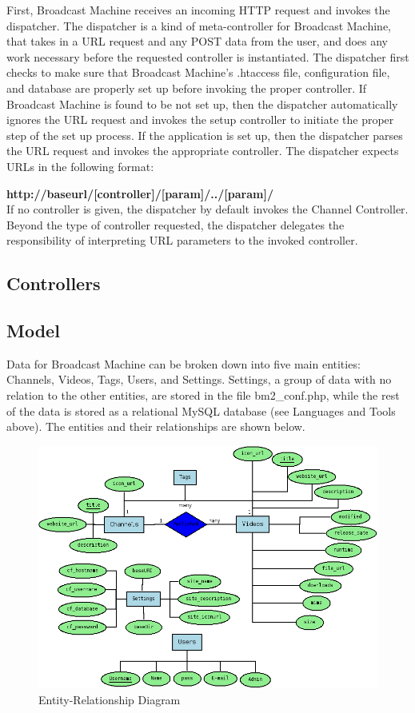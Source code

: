 \documentclass[a4paper,12pt]{report}
\begin{document}
First, Broadcast Machine receives an incoming HTTP request and invokes the dispatcher. The dispatcher is a kind of meta-controller for Broadcast Machine, that takes in a URL request and any POST data from the user, and does any work necessary before the requested controller is instantiated. The dispatcher first checks to make sure that Broadcast Machine's .htaccess file, configuration file, and database are properly set up before invoking the proper controller. If Broadcast Machine is found to be not set up, then the dispatcher automatically ignores the URL request and invokes the setup controller to initiate the proper step of the set up process. If the application is set up, then the dispatcher parses the URL request and invokes the appropriate controller. The dispatcher expects URLs in the following format:

\textbf{http://baseurl/[controller]/[param]/../[param]/} \\

If no controller is given, the dispatcher by default invokes the Channel Controller. Beyond the type of controller requested, the dispatcher delegates the responsibility of interpreting URL parameters to the invoked controller.

\subsection{Controllers}

\subsection{Model}
Data for Broadcast Machine can be broken down into five main entities: Channels, Videos, Tags, Users, and Settings. Settings, a group of data with no relation to the other entities, are stored in the file bm2\_conf.php, while the rest of the data is stored as a relational MySQL database (see Languages and Tools above). The entities and their relationships are shown below.
\begin{figure}[h]
\begin{center}
\includegraphics[scale=0.45]{./images/er.png}
\end{center}
\caption{Entity-Relationship Diagram}
\end{figure}
\end{document}
